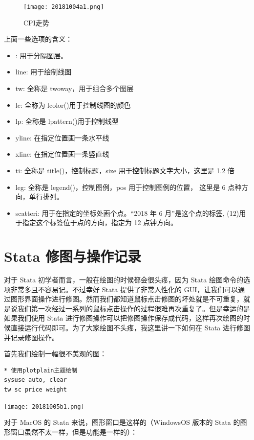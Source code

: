 \documentclass[cn,fancy,blue,11pt]{elegantbook}
\begin{document}
\begin{figure}
  \centering
  \texttt{[image: 20181004a1.png]}
  \caption{CPI走势}
  \label{fig:20181004a1}
\end{figure}

上面一些选项的含义：

\begin{itemize}
\item
  \textbar{}\textbar{}: 用于分隔图层。
\item
  line: 用于绘制线图
\item
  tw: 全称是 twoway，用于组合多个图层
\item
  lc: 全称为 lcolor()用于控制线图的颜色
\item
  lp: 全称是 lpattern()用于控制线型
\item
  yline: 在指定位置画一条水平线
\item
  xline: 在指定位置画一条竖直线
\item
  ti: 全称是 title()，控制标题，size 用于控制标题文字大小，这里是 1.2 倍
\item
  leg: 全称是 legend()，控制图例，pos 用于控制图例的位置，
  这里是 6 点种方向，单行排列。
\item
  scatteri: 用于在指定的坐标处画个点。``2018 年 6 月''是这个点的标签, (12)用于指定这个标签位于点的方向，指定为 12 点钟方向。
\end{itemize}

\hypertarget{stata--9}{%
\chapter{Stata 修图与操作记录}\label{stata--9}}

对于 Stata 初学者而言，一般在绘图的时候都会很头疼，因为 Stata 绘图命令的选项非常多且不容易记。不过幸好 Stata 提供了非常人性化的 GUI，让我们可以通过图形界面操作进行修图。然而我们都知道鼠标点击修图的坏处就是不可重复，就是说我们第一次经过一系列的鼠标点击操作的过程很难再次重复了。但是幸运的是如果我们使用 Stata 进行修图操作可以把修图操作保存成代码，这样再次绘图的时候直接运行代码即可。为了大家绘图不头疼，我这里讲一下如何在 Stata 进行修图并记录修图操作。

首先我们绘制一幅很不美观的图：

\begin{lstlisting}
* 使用plotplain主题绘制
sysuse auto, clear
tw sc price weight
\end{lstlisting}

\texttt{[image: 20181005b1.png]}

对于 MacOS 的 Stata 来说，图形窗口是这样的（WindowsOS 版本的 Stata 的图形窗口虽然不太一样，但是功能是一样的）：
\end{document}
